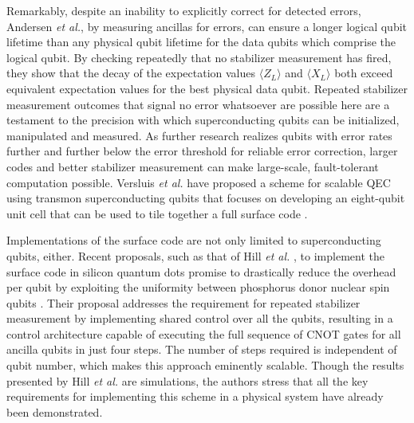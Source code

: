 Remarkably, despite an inability to explicitly correct for detected errors,
Andersen \textit{et al.}, by measuring ancillas for errors, can ensure a longer
logical qubit lifetime than any physical qubit lifetime for the data qubits
which comprise the logical qubit. By checking repeatedly that no stabilizer
measurement has fired, they show that the decay of the expectation values
$\langle Z_L \rangle$ and $\langle X_L \rangle$ both exceed equivalent
expectation values for the best physical data qubit. Repeated stabilizer
measurement outcomes that signal no error whatsoever are possible here are a
testament to the precision with which superconducting qubits can be initialized,
manipulated and measured. As further research realizes qubits with error rates
further and further below the error threshold for reliable error correction,
larger codes and better stabilizer measurement can make large-scale,
fault-tolerant computation possible. Versluis \textit{et al.} have proposed a
scheme for scalable QEC using transmon superconducting qubits that focuses on
developing an eight-qubit unit cell that can be used to tile together a full
surface code \cite{Versluis_2017}.

Implementations of the surface code are not only limited to superconducting
qubits, either. Recent proposals, such as that of Hill \textit{et al.} , to
implement the surface code in silicon quantum dots promise to drastically reduce
the overhead per qubit by exploiting the uniformity between phosphorus donor
nuclear spin qubits \cite{silicon_surface_code}. Their proposal addresses the
requirement for repeated stabilizer measurement by implementing shared control
over all the qubits, resulting in a control architecture capable of executing
the full sequence of CNOT gates for all ancilla qubits in just four steps. The
number of steps required is independent of qubit number, which makes this
approach eminently scalable. Though the results presented by Hill \textit{et
  al.} are simulations, the authors stress that all the key requirements for
implementing this scheme in a physical system have already been demonstrated.

